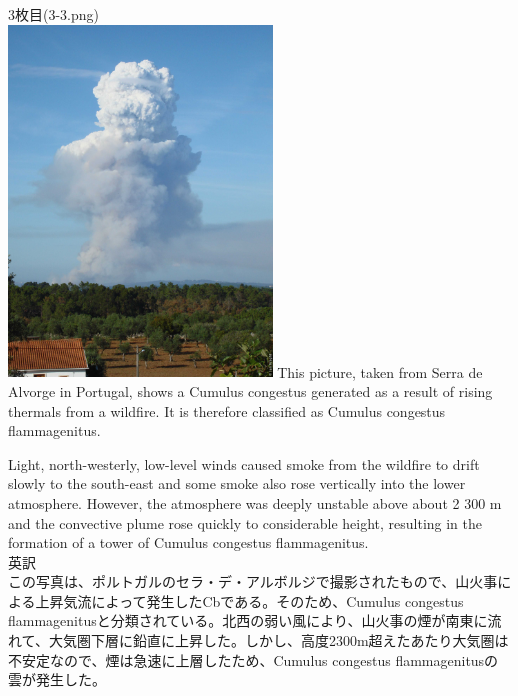\documentclass{jsarticle}
\begin{document}
3枚目(3-3.png)\\
\includegraphics[width=7cm]{3-3.png}
This picture, taken from Serra de Alvorge in Portugal, shows a Cumulus congestus generated as a result of rising thermals from a wildfire. It is therefore classified as Cumulus congestus flammagenitus.

Light, north-westerly, low-level winds caused smoke from the wildfire to drift slowly to the south-east and some smoke also rose vertically into the lower atmosphere. However, the atmosphere was deeply unstable above about 2 300 m and the convective plume rose quickly to considerable height, resulting in the formation of a tower of Cumulus congestus flammagenitus.
\\英訳\\
この写真は、ポルトガルのセラ・デ・アルボルジで撮影されたもので、山火事による上昇気流によって発生したCbである。そのため、Cumulus congestus flammagenitusと分類されている。北西の弱い風により、山火事の煙が南東に流れて、大気圏下層に鉛直に上昇した。しかし、高度2300m超えたあたり大気圏は不安定なので、煙は急速に上層したため、Cumulus congestus flammagenitusの雲が発生した。
\end{document}
